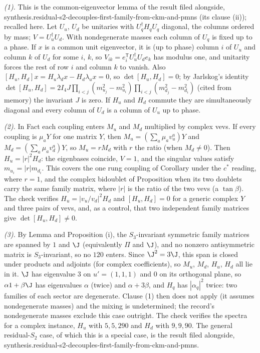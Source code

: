 \emph{(1).} This is the common-eigenvector lemma of the result filed alongside, synthesis.residual-s2-decouples-first-family-from-ckm-and-pmns (its clause (ii)); recalled here. Let $U_{u}$, $U_{d}$ be unitaries with $U_{q}^{\dagger}H_{q}U_{q}$ diagonal, the columns ordered by mass; $V = U_{u}^{\dagger}U_{d}$. With nondegenerate masses each column of $U_{q}$ is fixed up to a phase. If $x$ is a common unit eigenvector, it is (up to phase) column $i$ of $U_{u}$ and column $k$ of $U_{d}$ for some $i$, $k$, so $V_{ik} = e_{i}^{\mathsf{T}}U_{u}^{\dagger}U_{d}e_{k}$ has modulus one, and unitarity forces the rest of row $i$ and column $k$ to vanish. Also $[H_{u}, H_{d}]x = H_{u}\lambda_{d}x - H_{d}\lambda_{u}x = 0$, so $\det[H_{u}, H_{d}] = 0$; by Jarlskog's identity $\det[H_{u}, H_{d}] = 2I_{4}J\prod_{i<j}(m_{u_{j}}^{2} - m_{u_{i}}^{2})\prod_{i<j}(m_{d_{j}}^{2} - m_{d_{i}}^{2})$ (cited from memory) the invariant $J$ is zero. If $H_{u}$ and $H_{d}$ commute they are simultaneously diagonal and every column of $U_{d}$ is a column of $U_{u}$ up to phase.

\emph{(2).} In Fact  each coupling enters $M_{u}$ and $M_{d}$ multiplied by complex vevs. If every coupling is $\mu_{a}Y$ for one matrix $Y$, then $M_{u} = (\sum_{a}\mu_{a}v^{a}_{u})Y$ and $M_{d} = (\sum_{a}\mu_{a}v^{a}_{d})Y$, so $M_{u} = rM_{d}$ with $r$ the ratio (when $M_{d} \ne 0$). Then $H_{u} = |r|^{2}H_{d}$: the eigenbases coincide, $V = 1$, and the singular values satisfy $m_{u_{i}} = |r|m_{d_{i}}$. This covers the one rung coupling of Corollary  under the $c^{*}$ reading, where $r = 1$, and the complex bidoublet of Proposition  when its two doublets carry the same family matrix, where $|r|$ is the ratio of the two vevs (a $\tan\beta$). The check verifies $H_{u} = |v_{u}/v_{d}|^{2}H_{d}$ and $[H_{u}, H_{d}] = 0$ for a generic complex $Y$ and three pairs of vevs, and, as a control, that two independent family matrices give $\det[H_{u}, H_{d}] \ne 0$.

\emph{(3).} By Lemma  and Proposition (i), the $S_{3}$-invariant symmetric family matrices are spanned by $1$ and $\J$ (equivalently $\Pi$ and $\J$), and no nonzero antisymmetric matrix is $S_{3}$-invariant, so no $120$ enters. Since $\J^{2} = 3\J$, this span is closed under products and adjoints (for complex coefficients), so $M_{u}$, $M_{d}$, $H_{u}$, $H_{d}$ all lie in it. $\J$ has eigenvalue $3$ on $u' = (1,1,1)$ and $0$ on its orthogonal plane, so $\alpha 1 + \beta\J$ has eigenvalues $\alpha$ (twice) and $\alpha + 3\beta$, and $H_{q}$ has $|\alpha_{q}|^{2}$ twice: two families of each sector are degenerate. Clause (1) then does not apply (it assumes nondegenerate masses) and the mixing is undetermined; the record's nondegenerate masses exclude this case outright. The check verifies the spectra for a complex instance, $H_{u}$ with $5, 5, 290$ and $H_{d}$ with $9, 9, 90$. The general residual-$S_{2}$ case, of which this is a special case, is the result filed alongside, synthesis.residual-s2-decouples-first-family-from-ckm-and-pmns.

